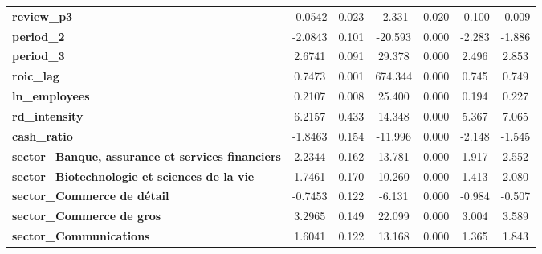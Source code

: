 \begin{center}
\begin{tabular}{lcccccc}
\textbf{review\_p3}                                                   &      -0.0542  &        0.023     &    -2.331  &         0.020        &       -0.100    &       -0.009     \\
\textbf{period\_2}                                                    &      -2.0843  &        0.101     &   -20.593  &         0.000        &       -2.283    &       -1.886     \\
\textbf{period\_3}                                                    &       2.6741  &        0.091     &    29.378  &         0.000        &        2.496    &        2.853     \\
\textbf{roic\_lag}                                                    &       0.7473  &        0.001     &   674.344  &         0.000        &        0.745    &        0.749     \\
\textbf{ln\_employees}                                                &       0.2107  &        0.008     &    25.400  &         0.000        &        0.194    &        0.227     \\
\textbf{rd\_intensity}                                                &       6.2157  &        0.433     &    14.348  &         0.000        &        5.367    &        7.065     \\
\textbf{cash\_ratio}                                                  &      -1.8463  &        0.154     &   -11.996  &         0.000        &       -2.148    &       -1.545     \\
\textbf{sector\_Banque, assurance et services financiers}             &       2.2344  &        0.162     &    13.781  &         0.000        &        1.917    &        2.552     \\
\textbf{sector\_Biotechnologie et sciences de la vie}                 &       1.7461  &        0.170     &    10.260  &         0.000        &        1.413    &        2.080     \\
\textbf{sector\_Commerce de détail}                                   &      -0.7453  &        0.122     &    -6.131  &         0.000        &       -0.984    &       -0.507     \\
\textbf{sector\_Commerce de gros}                                     &       3.2965  &        0.149     &    22.099  &         0.000        &        3.004    &        3.589     \\
\textbf{sector\_Communications}                                       &       1.6041  &        0.122     &    13.168  &         0.000        &        1.365    &        1.843     \\

\end{tabular}
\end{center}
